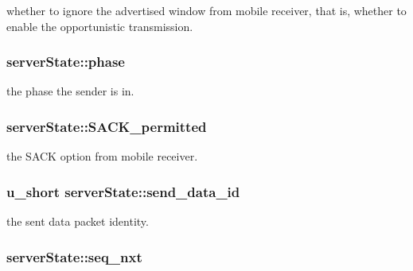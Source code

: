 whether to ignore the advertised window from mobile receiver, that is, whether to enable the opportunistic transmission. 

\hypertarget{structserverState_ad2d20da3d49d1d327e5b96a3b4933645}{
\subsubsection[{phase}]{ {\bf server\-State\-::phase}}}\label{structserverState_ad2d20da3d49d1d327e5b96a3b4933645}


the phase the sender is in. 

\hypertarget{structserverState_ad0e4f529996482b0658b0a65f593d687}{
\subsubsection[{\-S\-A\-C\-K\-\_\-permitted}]{ {\bf server\-State\-::\-S\-A\-C\-K\-\_\-permitted}}}\label{structserverState_ad0e4f529996482b0658b0a65f593d687}


the \-S\-A\-C\-K option from mobile receiver. 

\hypertarget{structserverState_a0d366ea25cf9e9c2adb3dea2ff2b8a6c}{
\subsubsection[{send\-\_\-data\-\_\-id}]{\setlength{\rightskip}{0pt plus 5cm}u\-\_\-short {\bf server\-State\-::send\-\_\-data\-\_\-id}}}\label{structserverState_a0d366ea25cf9e9c2adb3dea2ff2b8a6c}


the sent data packet identity. 

\hypertarget{structserverState_ac444397fe03359cdc31e8c26e4000a0a}{
\subsubsection[{seq\-\_\-nxt}]{ {\bf server\-State\-::seq\-\_\-nxt}}}\label{structserverState_ac444397fe03359cdc31e8c26e4000a0a}


